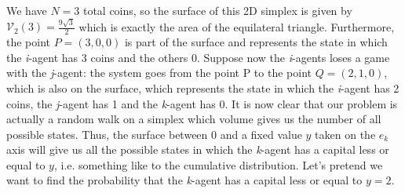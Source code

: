 We have $N=3$ total coins, so the surface of this 2D simplex is given by $\mathcal{V}_{2}\left(3\right) = \frac{9\sqrt{3}}{2}$ which is exactly the area of the equilateral triangle.
Furthermore, the point $P = (3, 0, 0)$ is part of the surface and represents the state in which the \emph{i}-agent has 3 coins and the others 0.
Suppose now the \emph{i}-agents loses a game with the \emph{j}-agent: the system goes from the point P to the point $Q = (2, 1, 0)$, which is also on the surface, which represents the state in which the \emph{i}-agent has 2 coins, the \emph{j}-agent has 1 and the \emph{k}-agent has 0.
It is now clear that our problem is actually a random walk on a simplex which volume gives us the number of all possible states.
Thus, the surface between 0 and a fixed value $y$ taken on the $e_k$ axis will give us all the possible states in which the \emph{k}-agent has a capital less or equal to $y$, i.e. something like to the cumulative distribution.
Let's pretend we want to find the probability that the \emph{k}-agent has a capital less or equal to $y=2$.
